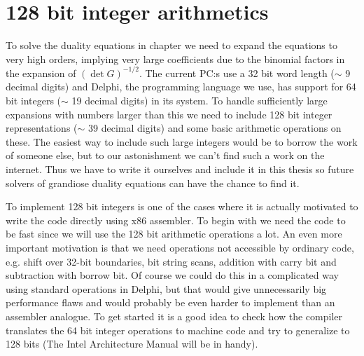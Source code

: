 \chapter{128 bit integer arithmetics}
To solve the duality equations in chapter  we need to expand the equations to very high orders, implying very large coefficients due to the binomial factors in the expansion of $(\det G)^{-1/2}$. 
The current PC:s use a 32 bit word length ($\sim$ 9 decimal digits) and Delphi, the programming language we use, has support for 64 bit integers ($\sim$ 19 decimal digits) in its system.
To handle sufficiently large expansions with numbers larger than this we need to include 128 bit integer representations ($\sim$ 39 decimal digits) and some basic arithmetic operations on these. 
The easiest way to include such large integers would be to borrow the work of someone else, but to our astonishment we can't find such a work on the internet. Thus we have to write it ourselves and include it in this thesis so future solvers of grandiose duality equations can have the chance to find it.       

To implement 128 bit integers is one of the cases where it is actually motivated to write the code directly using x86 assembler.
To begin with we need the code to be fast since we will use the 128 bit arithmetic operations a lot.
An even more important motivation is that we need operations not accessible by ordinary code, e.g. shift over 32-bit boundaries, bit string scans, addition with carry bit and subtraction with borrow bit. Of course we could do this in a complicated way using standard operations in Delphi, but that would give unnecessarily big performance flaws and would probably be even harder to implement than an assembler analogue.    
To get started it is a good idea to check how the compiler translates the 64 bit integer operations to machine code and try to generalize to 128 bits (The Intel Architecture Manual\cite{intel} will be in handy).

